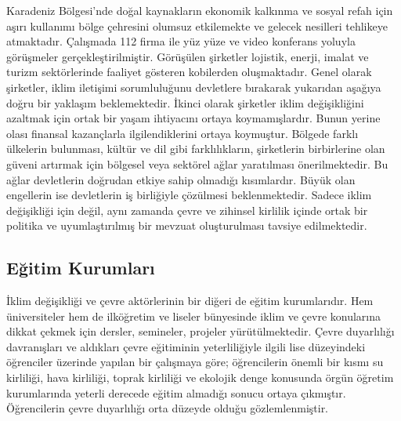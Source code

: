 \documentclass[
]{book}
\begin{document}
Karadeniz Bölgesi'nde doğal kaynakların ekonomik kalkınma ve sosyal refah için aşırı kullanımı bölge çehresini olumsuz etkilemekte ve gelecek nesilleri tehlikeye atmaktadır. Çalışmada 112 firma ile yüz yüze ve video konferans yoluyla görüşmeler gerçekleştirilmiştir. Görüşülen şirketler lojistik, enerji, imalat ve turizm sektörlerinde faaliyet gösteren kobilerden oluşmaktadır. Genel olarak şirketler, iklim iletişimi sorumluluğunu devletlere bırakarak yukarıdan aşağıya doğru bir yaklaşım beklemektedir. İkinci olarak şirketler iklim değişikliğini azaltmak için ortak bir yaşam ihtiyacını ortaya koymamışlardır. Bunun yerine olası finansal kazançlarla ilgilendiklerini ortaya koymuştur. Bölgede farklı ülkelerin bulunması, kültür ve dil gibi farklılıkların, şirketlerin birbirlerine olan güveni artırmak için bölgesel veya sektörel ağlar yaratılması önerilmektedir. Bu ağlar devletlerin doğrudan etkiye sahip olmadığı kısımlardır. Büyük olan engellerin ise devletlerin iş birliğiyle çözülmesi beklenmektedir. Sadece iklim değişikliği için değil, aynı zamanda çevre ve zihinsel kirlilik içinde ortak bir politika ve uyumlaştırılmış bir mevzuat oluşturulması tavsiye edilmektedir. \citep{ozuyar2019lessons}

\hypertarget{eux11fitim-kurumlarux131}{%
\subsection{Eğitim Kurumları}\label{eux11fitim-kurumlarux131}}

İklim değişikliği ve çevre aktörlerinin bir diğeri de eğitim kurumlarıdır. Hem üniversiteler hem de ilköğretim ve liseler bünyesinde iklim ve çevre konularına dikkat çekmek için dersler, semineler, projeler yürütülmektedir. Çevre duyarlılığı davranışları ve aldıkları çevre eğitiminin yeterliliğiyle ilgili lise düzeyindeki öğrenciler üzerinde yapılan bir çalışmaya göre; öğrencilerin önemli bir kısmı su kirliliği, hava kirliliği, toprak kirliliği ve ekolojik denge konusunda örgün öğretim kurumlarında yeterli derecede eğitim almadığı sonucu ortaya çıkmıştır. Öğrencilerin çevre duyarlılığı orta düzeyde olduğu gözlemlenmiştir. \citep{aydin2011sosyal}
\end{document}
